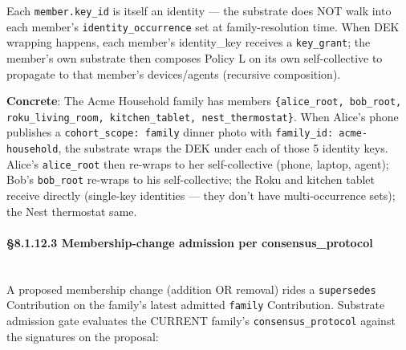 \documentclass[11pt]{article}
\begin{document}
Each \texttt{member.key\_id} is itself an identity — the substrate does NOT walk into each member's \texttt{identity\_occurrence} set at family-resolution time. When DEK wrapping happens, each member's identity\_key receives a \texttt{key\_grant}; the member's own substrate then composes Policy L on its own self-collective to propagate to that member's devices/agents (recursive composition).


\textbf{Concrete}: The Acme Household family has members \texttt{\{alice\_root, bob\_root, roku\_living\_room, kitchen\_tablet, nest\_thermostat\}}. When Alice's phone publishes a \texttt{cohort\_scope: family} dinner photo with \texttt{family\_id: acme-household}, the substrate wraps the DEK under each of those 5 identity keys. Alice's \texttt{alice\_root} then re-wraps to her self-collective (phone, laptop, agent); Bob's \texttt{bob\_root} re-wraps to his self-collective; the Roku and kitchen tablet receive directly (single-key identities — they don't have multi-occurrence sets); the Nest thermostat same.


\paragraph{§8.1.12.3 Membership-change admission per consensus\_protocol}\mbox{}\\


A proposed membership change (addition OR removal) rides a \texttt{supersedes} Contribution on the family's latest admitted \texttt{family} Contribution. Substrate admission gate evaluates the CURRENT family's \texttt{consensus\_protocol} against the signatures on the proposal:
\end{document}
